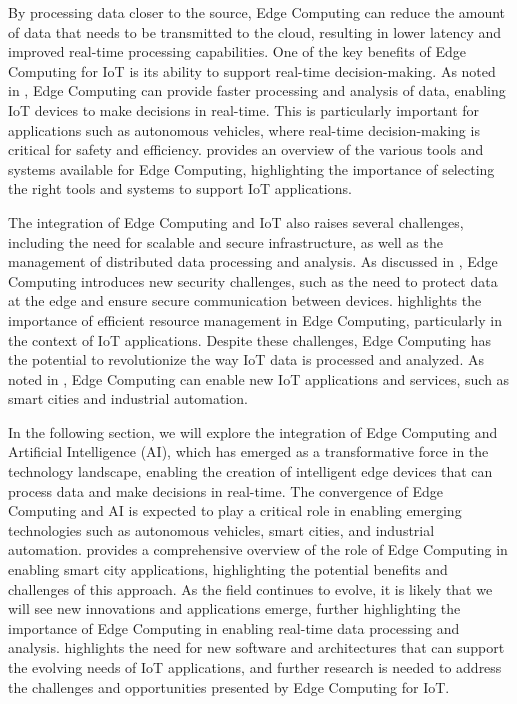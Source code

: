 \documentclass[11pt,a4paper]{article}
\begin{document}
By processing data closer to the source, Edge Computing can reduce the amount of data that needs to be transmitted to the cloud, resulting in lower latency and improved real-time processing capabilities. One of the key benefits of Edge Computing for IoT is its ability to support real-time decision-making. As noted in \cite{arxiv:1807.00976}, Edge Computing can provide faster processing and analysis of data, enabling IoT devices to make decisions in real-time. This is particularly important for applications such as autonomous vehicles, where real-time decision-making is critical for safety and efficiency. \cite{arxiv:1911.02794} provides an overview of the various tools and systems available for Edge Computing, highlighting the importance of selecting the right tools and systems to support IoT applications.

The integration of Edge Computing and IoT also raises several challenges, including the need for scalable and secure infrastructure, as well as the management of distributed data processing and analysis. As discussed in \cite{arxiv:2206.07164}, Edge Computing introduces new security challenges, such as the need to protect data at the edge and ensure secure communication between devices. \cite{arxiv:2108.00591} highlights the importance of efficient resource management in Edge Computing, particularly in the context of IoT applications. Despite these challenges, Edge Computing has the potential to revolutionize the way IoT data is processed and analyzed. As noted in \cite{arxiv:1811.11268}, Edge Computing can enable new IoT applications and services, such as smart cities and industrial automation.

In the following section, we will explore the integration of Edge Computing and Artificial Intelligence (AI), which has emerged as a transformative force in the technology landscape, enabling the creation of intelligent edge devices that can process data and make decisions in real-time. The convergence of Edge Computing and AI is expected to play a critical role in enabling emerging technologies such as autonomous vehicles, smart cities, and industrial automation. \cite{arxiv:1909.08747} provides a comprehensive overview of the role of Edge Computing in enabling smart city applications, highlighting the potential benefits and challenges of this approach. As the field continues to evolve, it is likely that we will see new innovations and applications emerge, further highlighting the importance of Edge Computing in enabling real-time data processing and analysis. \cite{arxiv:2407.05963} highlights the need for new software and architectures that can support the evolving needs of IoT applications, and further research is needed to address the challenges and opportunities presented by Edge Computing for IoT.
\end{document}
